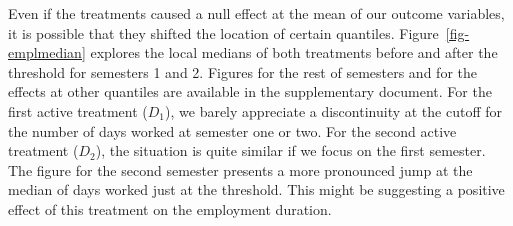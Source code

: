\documentclass[
  11pt]{article}
\begin{document}
\begin{table}

\caption{\label{tbl-emplmean}Estimates of employment duration effects
for each treatment at the mean, semesters 1 to 4.}


\end{table}%

Even if the treatments caused a null effect at the mean of our outcome
variables, it is possible that they shifted the location of certain
quantiles. Figure~\ref{fig-emplmedian} explores the local medians of
both treatments before and after the threshold for semesters 1 and 2.
Figures for the rest of semesters and for the effects at other quantiles
are available in the supplementary document. For the first active
treatment (\(D_1\)), we barely appreciate a discontinuity at the cutoff
for the number of days worked at semester one or two. For the second
active treatment (\(D_2\)), the situation is quite similar if we focus
on the first semester. The figure for the second semester presents a
more pronounced jump at the median of days worked just at the threshold.
This might be suggesting a positive effect of this treatment on the
employment duration.
\end{document}

